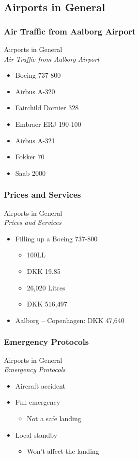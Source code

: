 \subsection{Airports in General}

\subsubsection{Air Traffic from Aalborg Airport}
\begin{frame}{Airports in General\\\textit{Air Traffic from Aalborg Airport}}{}
	\begin{itemize}
		\item Boeing 737-800 
		\item Airbus A-320 
		\item Fairchild Dornier 328 
		\item Embraer ERJ 190-100 
		\item Airbus A-321 
		\item Fokker 70 
		\item Saab 2000 
	\end{itemize}
\end{frame}

\subsubsection{Prices and Services}
\begin{frame}{Airports in General\\\textit{Prices and Services}}{}
	\begin{itemize}
		\item Filling up a Boeing 737-800
			\begin{itemize}
				\item 100LL
				\item DKK 19.85
				\item 26,020 Litres
				\item DKK 516,497
			\end{itemize}
		\item Aalborg – Copenhagen: DKK 47,640
	\end{itemize}
\end{frame}

\subsubsection{Emergency Protocols}
\begin{frame}{Airports in General\\\textit{Emergency Protocols}}{}
	\begin{itemize}
		\item Aircraft accident
		\item Full emergency
			\begin{itemize}
				\item Not a safe landing
			\end{itemize}
		\item Local standby
			\begin{itemize}
				\item Won't affect the landing
			\end{itemize}
	\end{itemize}
\end{frame}